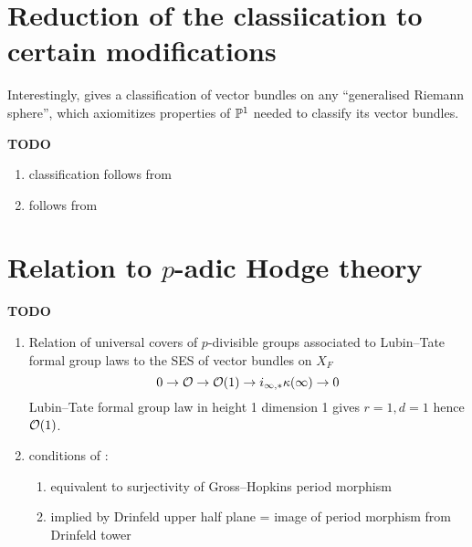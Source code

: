 \documentclass{article}
\begin{document}

\section{Reduction of the classiication to certain modifications}

Interestingly,
\cite[Section 5.6]{FF18}
gives a classification of vector bundles on any
``generalised Riemann sphere'',
which axiomitizes properties of $\mathbb{P}^1$ needed to classify its vector bundles.

\textbf{TODO}
\begin{enumerate}
  \item classification follows from \cite[Theorem 5.6.26]{FF18}
  \item \cite[Theorem 5.6.26]{FF18} follows from \cite[Theorem 5.6.29]{FF18}
\end{enumerate}

\section{Relation to $p$-adic Hodge theory}

\textbf{TODO} \begin{enumerate}
  \item Relation of universal covers of $p$-divisible groups 
  associated to Lubin--Tate formal group laws to 
  the SES of vector bundles on $X_F$
  \[
    0 \to \mathcal{O} \to \mathcal{O}(1) \to i_{\infty , *} \kappa(\infty) \to 0
  \]
  Lubin--Tate formal group law in height 1 dimension 1 
  gives $r = 1 , d = 1$ hence $\mathcal{O}(1)$.
  \cite[Section II.2.1]{FS24}
  \item conditions of \cite[Theorem 5.6.29]{FF18} : 
  \begin{enumerate}
    \item equivalent to surjectivity of Gross--Hopkins period morphism
    \item implied by Drinfeld upper half plane = 
    image of period morphism from Drinfeld tower
  \end{enumerate}
\end{enumerate}
\end{document}
